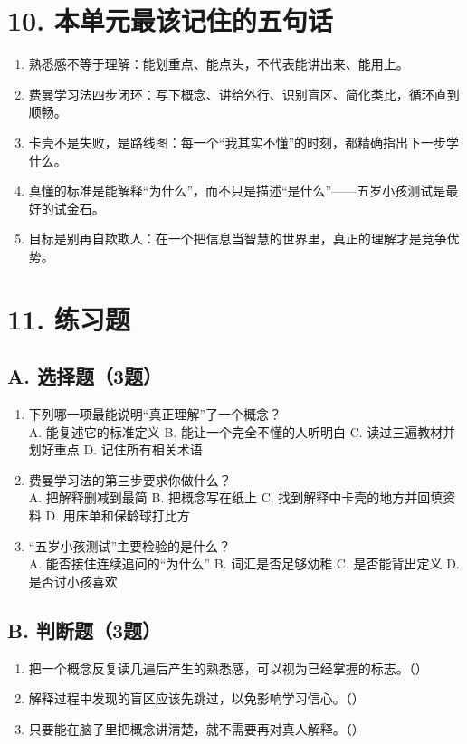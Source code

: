 \documentclass[UTF8,a4paper,11pt]{ctexart}
\begin{document}
\section*{10. 本单元最该记住的五句话}
\begin{enumerate}
  \item 熟悉感不等于理解：能划重点、能点头，不代表能讲出来、能用上。
  \item 费曼学习法四步闭环：写下概念、讲给外行、识别盲区、简化类比，循环直到顺畅。
  \item 卡壳不是失败，是路线图：每一个“我其实不懂”的时刻，都精确指出下一步学什么。
  \item 真懂的标准是能解释“为什么”，而不只是描述“是什么”——五岁小孩测试是最好的试金石。
  \item 目标是别再自欺欺人：在一个把信息当智慧的世界里，真正的理解才是竞争优势。
\end{enumerate}

\section*{11. 练习题}
\subsection*{A. 选择题（3题）}
\begin{enumerate}
  \item 下列哪一项最能说明“真正理解”了一个概念？\\
  A. 能复述它的标准定义 \quad B. 能让一个完全不懂的人听明白 \quad C. 读过三遍教材并划好重点 \quad D. 记住所有相关术语

  \item 费曼学习法的第三步要求你做什么？\\
  A. 把解释删减到最简 \quad B. 把概念写在纸上 \quad C. 找到解释中卡壳的地方并回填资料 \quad D. 用床单和保龄球打比方

  \item “五岁小孩测试”主要检验的是什么？\\
  A. 能否接住连续追问的“为什么” \quad B. 词汇是否足够幼稚 \quad C. 是否能背出定义 \quad D. 是否讨小孩喜欢

\end{enumerate}

\subsection*{B. 判断题（3题）}
\begin{enumerate}
  \item 把一个概念反复读几遍后产生的熟悉感，可以视为已经掌握的标志。（\quad）
  \item 解释过程中发现的盲区应该先跳过，以免影响学习信心。（\quad）
  \item 只要能在脑子里把概念讲清楚，就不需要再对真人解释。（\quad）
\end{enumerate}
\end{document}
